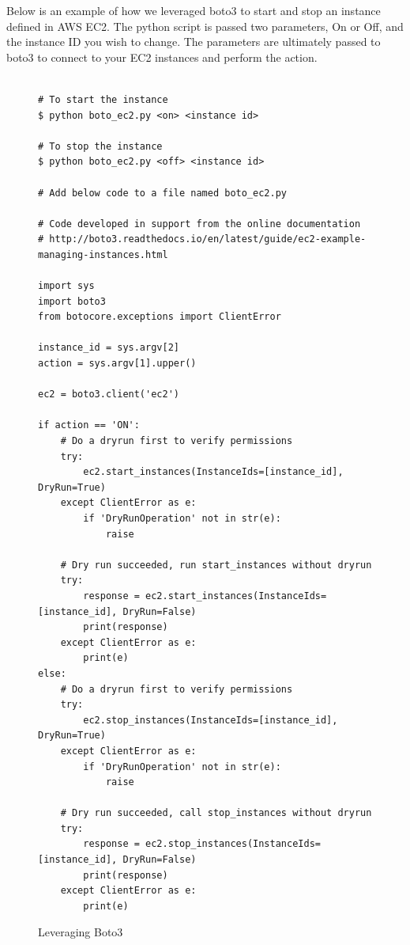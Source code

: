 Below is an example of how we leveraged boto3 to start and stop an instance defined in 
AWS EC2. The python script is passed two parameters, On or Off, and the instance ID you
wish to change. The parameters are ultimately passed to boto3 to connect to your EC2 
instances and perform the action.

\begin{figure}[htb]

\begin{verbatim}

# To start the instance
$ python boto_ec2.py <on> <instance id>

# To stop the instance
$ python boto_ec2.py <off> <instance id>

# Add below code to a file named boto_ec2.py

# Code developed in support from the online documentation
# http://boto3.readthedocs.io/en/latest/guide/ec2-example-managing-instances.html

import sys
import boto3
from botocore.exceptions import ClientError

instance_id = sys.argv[2]
action = sys.argv[1].upper()

ec2 = boto3.client('ec2')

if action == 'ON':
    # Do a dryrun first to verify permissions
    try:
        ec2.start_instances(InstanceIds=[instance_id], DryRun=True)
    except ClientError as e:
        if 'DryRunOperation' not in str(e):
            raise

    # Dry run succeeded, run start_instances without dryrun
    try:
        response = ec2.start_instances(InstanceIds=[instance_id], DryRun=False)
        print(response)
    except ClientError as e:
        print(e)
else:
    # Do a dryrun first to verify permissions
    try:
        ec2.stop_instances(InstanceIds=[instance_id], DryRun=True)
    except ClientError as e:
        if 'DryRunOperation' not in str(e):
            raise

    # Dry run succeeded, call stop_instances without dryrun
    try:
        response = ec2.stop_instances(InstanceIds=[instance_id], DryRun=False)
        print(response)
    except ClientError as e:
        print(e)

\end{verbatim}

\caption{Leveraging Boto3 \cite{hid-sp18-518-Boto3}}\label{c:boto3-example}

\end{figure}

